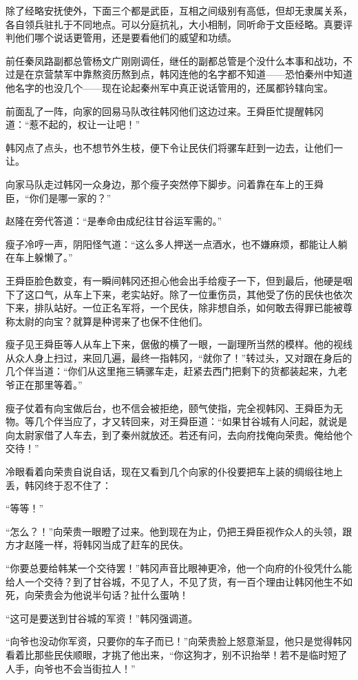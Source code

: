 除了经略安抚使外，下面三个都是武臣，互相之间级别有高低，但却无隶属关系，各自领兵驻扎于不同地点。可以分庭抗礼，大小相制，同听命于文臣经略。真要评判他们哪个说话更管用，还是要看他们的威望和功绩。

前任秦凤路副都总管杨文广刚刚调任，继任的副都总管是个没什么本事和战功，不过是在京营禁军中靠熬资历熬到点，韩冈连他的名字都不知道——恐怕秦州中知道他名字的也没几个——现在论起秦州军中真正说话管用的，还属都钤辖向宝。

前面乱了一阵，向家的回易马队改往韩冈他们这边过来。王舜臣忙提醒韩冈道：“惹不起的，权让一让吧！”

韩冈点了点头，也不想节外生枝，便下令让民伕们将骡车赶到一边去，让他们一让。

向家马队走过韩冈一众身边，那个瘦子突然停下脚步。问着靠在车上的王舜臣，“你们是哪一家的？”

赵隆在旁代答道：“是奉命由成纪往甘谷运军需的。”

瘦子冷哼一声，阴阳怪气道：“这么多人押送一点酒水，也不嫌麻烦，都能让人躺在车上躲懒了。”

王舜臣脸色数变，有一瞬间韩冈还担心他会出手给瘦子一下，但到最后，他硬是咽下了这口气，从车上下来，老实站好。除了一位重伤员，其他受了伤的民伕也依次下来，排队站好。一位正名军将，一个民伕，除非想自杀，如何敢去得罪已能被尊称太尉的向宝？就算是种谔来了也保不住他们。

瘦子见王舜臣等人从车上下来，倨傲的横了一眼，一副理所当然的模样。他的视线从众人身上扫过，来回几遍，最终一指韩冈，“就你了！”转过头，又对跟在身后的几个伴当道：“你们从这里拖三辆骡车走，赶紧去西门把剩下的货都装起来，九老爷正在那里等着。”

瘦子仗着有向宝做后台，也不信会被拒绝，颐气使指，完全视韩冈、王舜臣为无物。等几个伴当应了，才又转回来，对王舜臣道：“如果甘谷城有人问起，就说是向太尉家借了人车去，到了秦州就放还。若还有问，去向府找俺向荣贵。俺给他个交待！”

冷眼看着向荣贵自说自话，现在又看到几个向家的仆役要把车上装的绸缎往地上丢，韩冈终于忍不住了：

“等等！”

“怎么？！”向荣贵一眼瞪了过来。他到现在为止，仍把王舜臣视作众人的头领，跟方才赵隆一样，将韩冈当成了赶车的民伕。

“你要总要给韩某一个交待罢！”韩冈声音比眼神更冷，他一个向府的仆役凭什么能给人一个交待？到了甘谷城，不见了人，不见了货，有一百个理由让韩冈他生不如死，向荣贵会为他说半句话？扯什么蛋呐！

“这可是要送到甘谷城的军资！”韩冈强调道。

“向爷也没动你军资，只要你的车子而已！”向荣贵脸上怒意渐显，他只是觉得韩冈看着比那些民伕顺眼，才挑了他出来，“你这狗才，别不识抬举！若不是临时短了人手，向爷也不会当街拉人！”

